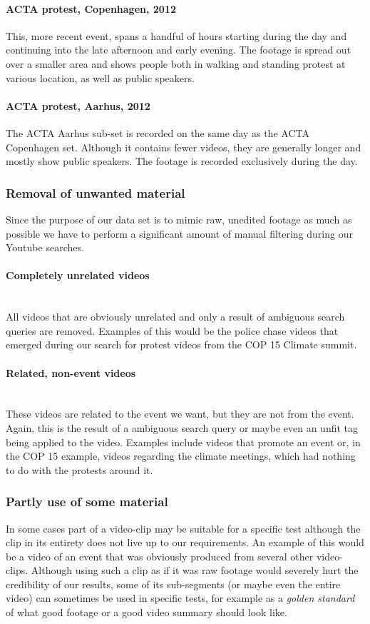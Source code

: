\paragraph{ACTA protest, Copenhagen, 2012}
%
This, more recent event, spans a handful of hours starting during the day and continuing into the late afternoon and early evening. The footage is spread out over a smaller area and shows people both in walking and standing protest at various location, as well as public speakers.
%
\paragraph{ACTA protest, Aarhus, 2012}
%
The ACTA Aarhus sub-set is recorded on the same day as the ACTA Copenhagen set. Although it contains fewer videos, they are generally longer and mostly show public speakers. The footage is recorded exclusively during the day.
%
\subsubsection{Removal of unwanted material}
%
Since the purpose of our data set is to mimic raw, unedited footage as much as possible we have to perform a significant amount of manual filtering during our Youtube searches.\\
%
\paragraph{Completely unrelated videos}\\
%
All videos that are obviously unrelated and only a result of ambiguous search queries are removed. Examples of this would be the police chase videos that emerged during our search for protest videos from the COP 15 Climate summit.\\
%
\paragraph{Related, non-event videos}\\
%
These videos are related to the event we want, but they are not from the event. Again, this is the result of a ambiguous search query or maybe even an unfit tag being applied to the video. Examples include videos that promote an event or, in the COP 15 example, videos regarding the climate meetings, which had nothing to do with the protests around it.
%
\subsubsection{Partly use of some material}
%
In some cases part of a video-clip may be suitable for a specific test although the clip in its entirety does not live up to our requirements. An example of this would be a video of an event that was obviously produced from several other video-clips. Although using such a clip as if it was raw footage would severely hurt the credibility of our results, some of its sub-segments (or maybe even the entire video) can sometimes be used in specific tests, for example as a \textit{golden standard} of what good footage or a good video summary should look like.
%
